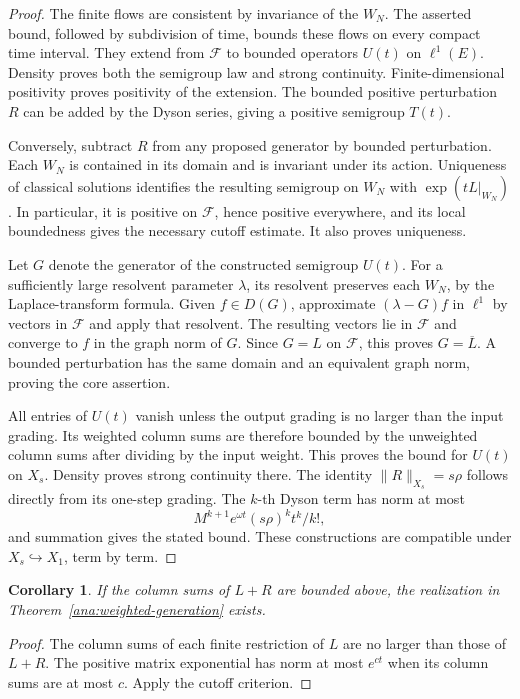 \documentclass[reqno]{amsart}
\newtheorem{corollary}[theorem]{Corollary}
\theoremstyle{definition}
\theoremstyle{remark}
\begin{document}
\begin{proof}
The finite flows are consistent by invariance of the \(W_N\).  The asserted
bound, followed by subdivision of time, bounds these flows on every compact
time interval.  They extend from \(\mathcal F\) to bounded operators \(U(t)\)
on \(\ell^1(E)\).  Density proves both the semigroup law and strong
continuity.  Finite-dimensional positivity proves positivity of the
extension.  The bounded positive perturbation \(R\) can be added by the
Dyson series, giving a positive semigroup \(T(t)\).

Conversely, subtract \(R\) from any proposed generator by bounded
perturbation.  Each \(W_N\) is contained in its domain and is invariant under
its action.  Uniqueness of classical solutions identifies the resulting
semigroup on \(W_N\) with \(\exp(tL|_{W_N})\).  In particular, it is positive
on \(\mathcal F\), hence positive everywhere, and its local boundedness
gives the necessary cutoff estimate.  It also proves uniqueness.

Let \(G\) denote the generator of the constructed semigroup \(U(t)\).
For a sufficiently large resolvent parameter \(\lambda\), its resolvent
preserves each \(W_N\), by the Laplace-transform formula.
Given \(f\in D(G)\), approximate
\((\lambda-G)f\) in \(\ell^1\) by vectors in \(\mathcal F\) and apply that
resolvent.  The resulting vectors lie in \(\mathcal F\) and converge to
\(f\) in the graph norm of \(G\).  Since \(G=L\) on \(\mathcal F\), this
proves \(G=\overline L\).  A bounded perturbation has the same domain and an
equivalent graph norm, proving the core assertion.

All entries of \(U(t)\) vanish unless the output grading is no larger than
the input grading.  Its weighted column sums are therefore bounded by the
unweighted column sums after dividing by the input weight.  This proves
the bound for \(U(t)\) on \(X_s\).  Density proves strong continuity there.
The identity \(\|R\|_{X_s}=s\rho\) follows directly from its one-step grading.
The \(k\)-th Dyson term has norm at most
\[
 M^{k+1}e^{\omega t}(s\rho)^k t^k/k!,
\]
and summation gives the stated bound.  These constructions are compatible
under \(X_s\hookrightarrow X_1\), term by term.
\end{proof}

\begin{corollary}\label{ana:column-sum}
If the column sums of \(L+R\) are bounded above, the realization in
Theorem~\ref{ana:weighted-generation} exists.
\end{corollary}
\begin{proof}
The column sums of each finite restriction of \(L\) are no larger than those
of \(L+R\).  The positive matrix exponential has norm at most \(e^{ct}\)
when its column sums are at most \(c\).  Apply the cutoff criterion.
\end{proof}
\end{document}
